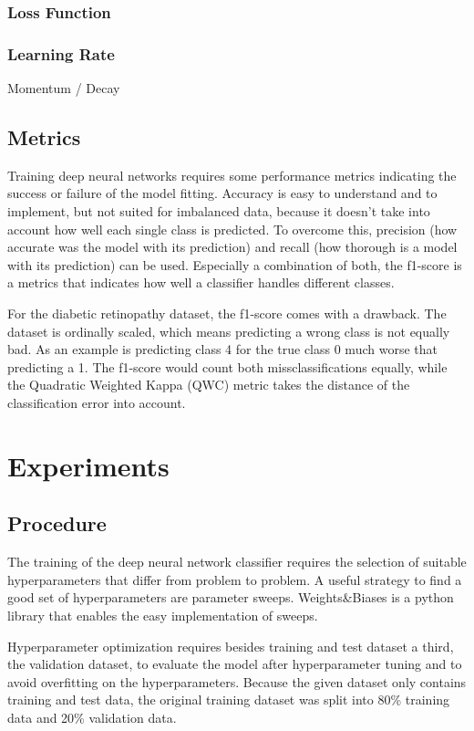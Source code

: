 \documentclass{article}
\begin{document}
\subsubsection{Loss Function}
\subsubsection{Learning Rate}
Momentum / Decay

\subsection{Metrics}
Training deep neural networks requires some performance metrics indicating the success or failure of the model fitting. Accuracy
is easy to understand and to implement, but not suited for imbalanced data, because it doesn't take into account how well each 
single class is predicted. 
To overcome this, precision (how accurate was the model with its prediction) and recall (how thorough is a model with its prediction) can be used. 
Especially a combination of both, the f1-score is a metrics that indicates how well a classifier handles different classes.

For the diabetic retinopathy dataset, the f1-score comes with a drawback. The dataset is ordinally scaled, which means predicting 
a wrong class is not equally bad. As an example is predicting class 4 for the true class 0 much worse that predicting a 1. The
f1-score would count both missclassifications equally, while the Quadratic Weighted Kappa (QWC) metric takes the distance of 
the classification error into account.
\section{Experiments}
\subsection{Procedure}
The training of the deep neural network classifier requires the selection of suitable hyperparameters that differ from
problem to problem. A useful strategy to find a good set of hyperparameters are parameter sweeps. Weights\&Biases is a 
python library that enables the easy implementation of sweeps. 

Hyperparameter optimization requires besides training and test dataset a third, the validation dataset, to evaluate the
model after hyperparameter tuning and to avoid overfitting on the hyperparameters. Because the given dataset only contains 
training and test data, the original training dataset was split into 80\% training data and 20\% validation data.
\end{document}
